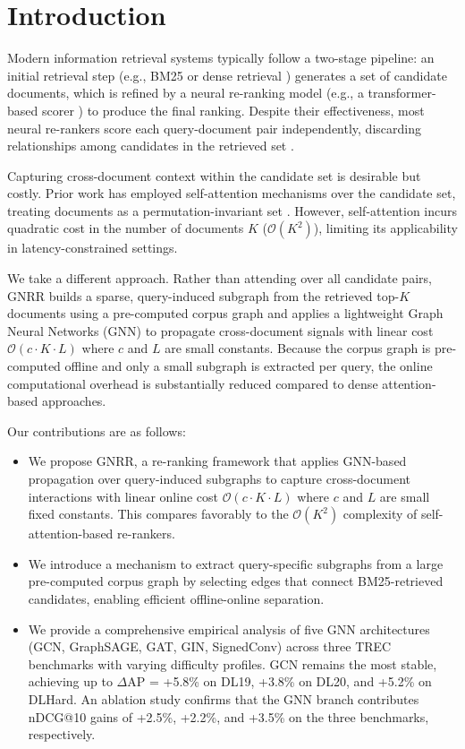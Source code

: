 \documentclass[runningheads]{llncs}
\newcommand{\ModelName}{\textsc{GNRR}\xspace}
\begin{document}
\section{Introduction}
Modern information retrieval systems typically follow a two-stage pipeline: an initial retrieval step (e.g., BM25 \cite{bm25} or dense retrieval \cite{colbert}) generates a set of candidate documents, which is refined by a neural re-ranking model (e.g., a transformer-based scorer \cite{tctcolbert,vaswani2017attention}) to produce the final ranking.
Despite their effectiveness, most neural re-rankers score each query-document pair independently, discarding relationships among candidates in the retrieved set \cite{monobert,RepBert}.

Capturing cross-document context within the candidate set is desirable but costly. Prior work \cite{pang2020setrank,pobrotyn2020context,pasumarthi2020permutation} has employed self-attention mechanisms over the candidate set, treating documents as a permutation-invariant set \cite{lee2019set,pang2020setrank}. However, self-attention incurs quadratic cost in the number of documents $K$ ($\mathcal{O}(K^2)$), limiting its applicability in latency-constrained settings.

We take a different approach. Rather than attending over all candidate pairs, \ModelName builds a sparse, query-induced subgraph from the retrieved top-$K$ documents using a pre-computed corpus graph \cite{corpusgraph} and applies a lightweight Graph Neural Networks (GNN) to propagate cross-document signals with linear cost $\mathcal{O}(c \cdot K \cdot L)$ where $c$ and $L$ are small constants. Because the corpus graph is pre-computed offline and only a small subgraph is extracted per query, the online computational overhead is substantially reduced compared to dense attention-based approaches.

Our contributions are as follows:
\begin{itemize}
    \item We propose \ModelName, a re-ranking framework that applies GNN-based propagation over query-induced subgraphs to capture cross-document interactions with linear online cost $\mathcal{O}(c \cdot K \cdot L)$ where $c$ and $L$ are small fixed constants. This compares favorably to the $\mathcal{O}(K^2)$ complexity of self-attention-based re-rankers.
    \item We introduce a mechanism to extract query-specific subgraphs from a large pre-computed corpus graph by selecting edges that connect BM25-retrieved candidates, enabling efficient offline-online separation.
    \item We provide a comprehensive empirical analysis of five GNN architectures (GCN, GraphSAGE, GAT, GIN, SignedConv) across three TREC benchmarks with varying difficulty profiles. GCN remains the most stable, achieving up to $\Delta$AP = +5.8\% on DL19, +3.8\% on DL20, and +5.2\% on DLHard. An ablation study confirms that the GNN branch contributes nDCG@10 gains of +2.5\%, +2.2\%, and +3.5\% on the three benchmarks, respectively. 
\end{itemize}
\end{document}
